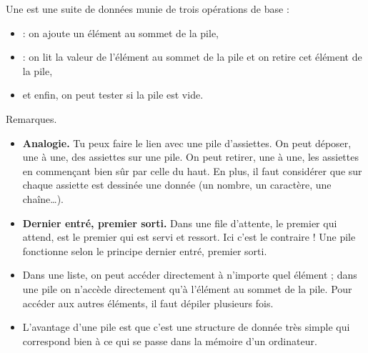 \documentclass[11pt,class=report,crop=false]{standalone}
\begin{document}
\newcommand{\badletter}[1]{\underline{\textcolor{red}{#1}}}






\begin{cours}[Pile]

  Une  est une suite de données munie de trois opérations de base :
  \begin{itemize}
    \item {} : on ajoute un élément au sommet de la pile,
    \item {} : on lit la valeur de l'élément au sommet de la pile et on retire cet élément de la pile,
    \item et enfin, on peut tester si la pile est vide.
  \end{itemize}  



Remarques.
\begin{itemize}
  \item \textbf{Analogie.} Tu peux faire le lien avec une pile d'assiettes. On peut déposer, une à une, des assiettes sur une pile. On peut retirer, une à une, les assiettes en commençant bien sûr par celle du haut. En plus, il faut considérer que sur chaque assiette est dessinée une donnée (un nombre, un caractère, une chaîne\ldots).

  \item \textbf{Dernier entré, premier sorti.} 
  Dans une file d'attente, le premier qui attend, est le premier qui est servi et ressort. Ici  c'est le contraire ! Une pile fonctionne selon le principe \og{}dernier entré, premier sorti\fg{}.
  
  \item Dans une liste, on peut accéder directement à n'importe quel élément ; dans une pile on n'accède directement  qu'à l'élément au sommet de la pile. Pour accéder aux autres éléments, il faut dépiler plusieurs fois.
  
  \item L'avantage d'une pile est que c'est une structure de donnée très simple qui correspond bien à ce qui se passe dans la mémoire d'un ordinateur.
\end{itemize}
\end{cours}
\end{document}
